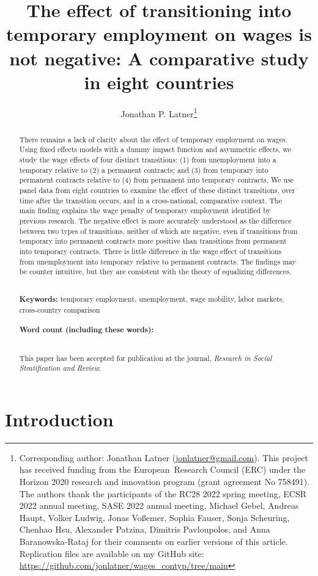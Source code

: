 \documentclass[12pt]{article}
\title{The effect of transitioning into temporary employment on wages is not negative: A comparative study in eight countries}
\author{Jonathan P. Latner\thanks{Corresponding author: Jonathan Latner (\url{jonlatner@gmail.com}).  This project has received funding from the European\ Research Council (ERC) under the Horizon 2020 research and innovation program (grant agreement No 758491).  The authors thank the participants of the RC28 2022 spring meeting, ECSR 2022 annual meeting, SASE 2022 annual meeting, Michael Gebel, Andreas Haupt, Volker Ludwig, Jonas Voßemer, Sophia Fauser, Sonja Scheuring, Chenhao Hsu, Alexander Patzina, Dimitris Pavloupolos, and Anna Baranowska-Rataj for their comments on earlier versions of this article.  Replication files are available on my GitHub site: \url{https://github.com/jonlatner/wages_contyp/tree/main}}}
\date{\vspace{-5ex}}
\newcommand\wordcount{}
\begin{document}
\maketitle

\begin{abstract}

\noindent 
There remains a lack of clarity about the effect of temporary employment on wages.  Using fixed effects models with a dummy impact function and asymmetric effects, we study the wage effects of four distinct transitions: (1) from unemployment into a temporary relative to (2) a permanent contracts; and (3) from temporary into permanent contracts relative to (4) from permanent into temporary contracts.  We use panel data from eight countries to examine the effect of these distinct transitions, over time after the transition occurs, and in a cross-national, comparative context.  The main finding explains the wage penalty of temporary employment identified by previous research.  The negative effect is more accurately understood as the difference between two types of transitions, neither of which are negative, even if transitions from temporary into permanent contracts more positive than transitions from permanent into temporary contracts.  There is little difference in the wage effect of transitions from unemployment into temporary relative to permanent contracts. The findings may be counter intuitive, but they are consistent with the theory of equalizing differences.  

\noindent
\\
{\bf Keywords:} temporary employment, unemployment, wage mobility, labor markets, cross-country comparison \\
\\
{\bf Word count (including these words):} \wordcount

\noindent
\\
This paper has been accepted for publication at the journal, \emph{Research in Social Stratification and Review}. \\

\end{abstract}

\doublespacing
\clearpage
\section{Introduction}
\end{document}
